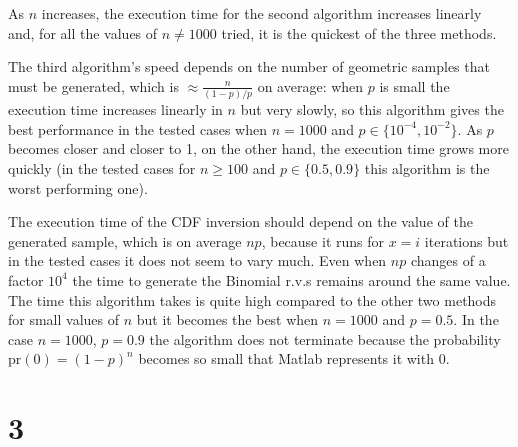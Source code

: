 \documentclass[a4paper,oneside]{article}
\begin{document}
As $n$ increases, the execution time for the second algorithm
increases linearly and, for all the values of $n \neq 1000$ tried, it
is the quickest of the three methods.

The third algorithm's speed depends on the number of geometric samples
that must be generated, which is $\approx \frac{n}{(1-p)/p}$ on
average: when $p$ is small the execution time increases linearly in
$n$ but very slowly, so this algorithm gives the best performance in
the tested cases when $n = 1000$ and $p \in \{10^{-4}, 10^{-2}\}$. As
$p$ becomes closer and closer to 1, on the other hand, the execution
time grows more quickly (in the tested cases for $n \geq 100$ and $p
\in \{0.5, 0.9\}$ this algorithm is the worst performing one).

The execution time of the CDF inversion should depend on the value of
the generated sample, which is on average $np$, because it runs for
$x=i$ iterations but in the tested cases it does not seem to vary
much.  Even when $np$ changes of a factor $10^4$ the time to generate
the Binomial r.v.s remains around the same value. The time this
algorithm takes is quite high compared to the other two methods for
small values of $n$ but it becomes the best when $n = 1000$ and $p =
0.5$. In the case $n = 1000$, $p=0.9$ the algorithm does not terminate
because the probability $\mathrm{pr}(0) = (1-p)^n$ becomes so small
that Matlab represents it with 0.
\section*{3}
\end{document}
